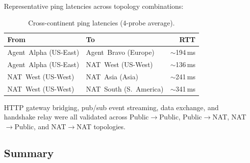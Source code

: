 \documentclass[11pt,a4paper]{article}
\begin{document}
Representative ping latencies across topology combinations:

\begin{table}[h]
\centering
\begin{tabular}{@{}llr@{}}
\toprule
\textbf{From} & \textbf{To} & \textbf{RTT} \\
\midrule
Agent~Alpha (US-East)  & Agent~Bravo (Europe)  & ${\sim}$194\,ms \\
Agent~Alpha (US-East)  & NAT~West (US-West)    & ${\sim}$136\,ms \\
NAT~West (US-West)     & NAT~Asia (Asia)       & ${\sim}$241\,ms \\
NAT~West (US-West)     & NAT~South (S.~America) & ${\sim}$341\,ms \\
\bottomrule
\end{tabular}
\caption{Cross-continent ping latencies (4-probe average).}
\label{tab:nat-latency}
\end{table}

HTTP gateway bridging, pub/sub event streaming, data exchange, and handshake relay were all validated across Public$\rightarrow$Public, Public$\rightarrow$NAT, NAT$\rightarrow$Public, and NAT$\rightarrow$NAT topologies.

\subsection{Summary}
\end{document}
